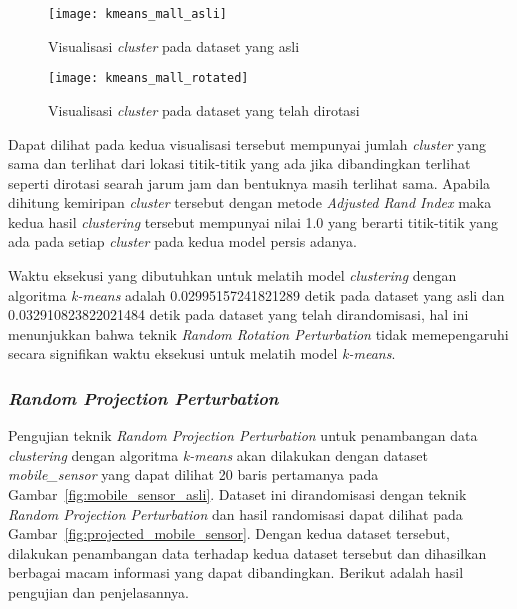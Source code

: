 \begin{figure}
	\centering
	\texttt{[image: kmeans\_mall\_asli]}
	\caption{Visualisasi \textit{cluster} pada dataset yang asli}
	\label{fig:kmeans_mall_asli}
\end{figure}

\begin{figure}
	\centering
	\texttt{[image: kmeans\_mall\_rotated]}
	\caption{Visualisasi \textit{cluster} pada dataset yang telah dirotasi}
	\label{fig:kmeans_mall_rotated}
\end{figure}

Dapat dilihat pada kedua visualisasi tersebut mempunyai jumlah \textit{cluster} yang sama dan terlihat dari lokasi titik-titik yang ada jika dibandingkan terlihat seperti dirotasi searah jarum jam dan bentuknya masih terlihat sama. Apabila dihitung kemiripan \textit{cluster} tersebut dengan metode \textit{Adjusted Rand Index} maka kedua hasil \textit{clustering} tersebut mempunyai nilai 1.0 yang berarti titik-titik yang ada pada setiap \textit{cluster} pada kedua model persis adanya.
	
Waktu eksekusi yang dibutuhkan untuk melatih model \textit{clustering} dengan algoritma \textit{k-means} adalah 0.02995157241821289 detik pada dataset yang asli dan 0.032910823822021484 detik pada dataset yang telah dirandomisasi, hal ini menunjukkan bahwa teknik \textit{Random Rotation Perturbation} tidak memepengaruhi secara signifikan waktu eksekusi untuk melatih model \textit{k-means}.

\subsubsection{\textit{Random Projection Perturbation}}
\label{subsubsec:pengujian-clustering-rpp}

Pengujian teknik \textit{Random Projection Perturbation} untuk penambangan data \textit{clustering} dengan algoritma \textit{k-means} akan dilakukan dengan dataset \textit{mobile\_sensor} yang dapat dilihat 20 baris pertamanya pada Gambar~\ref{fig:mobile_sensor_asli}. Dataset ini dirandomisasi dengan teknik \textit{Random Projection Perturbation} dan hasil randomisasi dapat dilihat pada Gambar~\ref{fig:projected_mobile_sensor}. Dengan kedua dataset tersebut, dilakukan penambangan data terhadap kedua dataset tersebut dan dihasilkan berbagai macam informasi yang dapat dibandingkan. Berikut adalah hasil pengujian dan penjelasannya.

